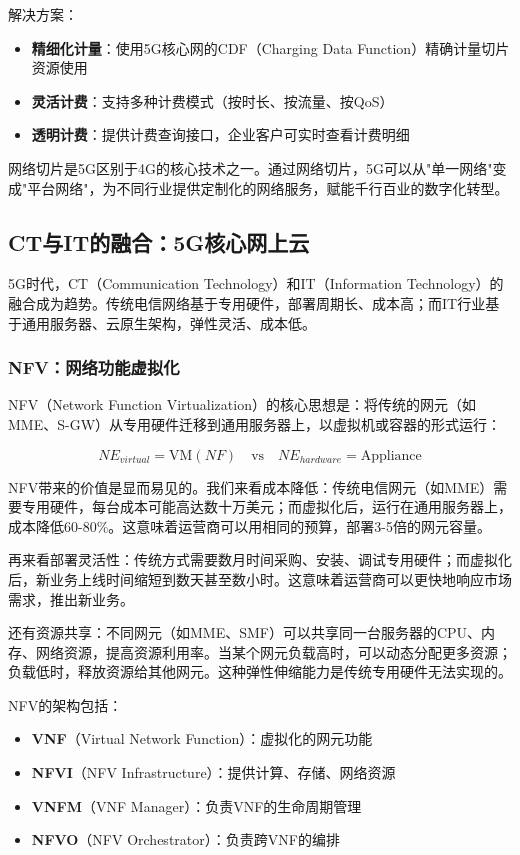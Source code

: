 解决方案：
\begin{itemize}
    \item \textbf{精细化计量}：使用5G核心网的CDF（Charging Data Function）精确计量切片资源使用
    \item \textbf{灵活计费}：支持多种计费模式（按时长、按流量、按QoS）
    \item \textbf{透明计费}：提供计费查询接口，企业客户可实时查看计费明细
\end{itemize}

网络切片是5G区别于4G的核心技术之一。通过网络切片，5G可以从"单一网络"变成"平台网络"，为不同行业提供定制化的网络服务，赋能千行百业的数字化转型。

\subsection{CT与IT的融合：5G核心网上云}

5G时代，CT（Communication Technology）和IT（Information Technology）的融合成为趋势。传统电信网络基于专用硬件，部署周期长、成本高；而IT行业基于通用服务器、云原生架构，弹性灵活、成本低。

\subsubsection{NFV：网络功能虚拟化}

NFV（Network Function Virtualization）的核心思想是：将传统的网元（如MME、S-GW）从专用硬件迁移到通用服务器上，以虚拟机或容器的形式运行：

\begin{equation}
NE_{virtual} = \text{VM}(NF) \quad \text{vs} \quad NE_{hardware} = \text{Appliance}
\end{equation}

NFV带来的价值是显而易见的。我们来看成本降低：传统电信网元（如MME）需要专用硬件，每台成本可能高达数十万美元；而虚拟化后，运行在通用服务器上，成本降低60-80\%。这意味着运营商可以用相同的预算，部署3-5倍的网元容量。

再来看部署灵活性：传统方式需要数月时间采购、安装、调试专用硬件；而虚拟化后，新业务上线时间缩短到数天甚至数小时。这意味着运营商可以更快地响应市场需求，推出新业务。

还有资源共享：不同网元（如MME、SMF）可以共享同一台服务器的CPU、内存、网络资源，提高资源利用率。当某个网元负载高时，可以动态分配更多资源；负载低时，释放资源给其他网元。这种弹性伸缩能力是传统专用硬件无法实现的。

NFV的架构包括：
\begin{itemize}
    \item \textbf{VNF}（Virtual Network Function）：虚拟化的网元功能
    \item \textbf{NFVI}（NFV Infrastructure）：提供计算、存储、网络资源
    \item \textbf{VNFM}（VNF Manager）：负责VNF的生命周期管理
    \item \textbf{NFVO}（NFV Orchestrator）：负责跨VNF的编排
\end{itemize}

